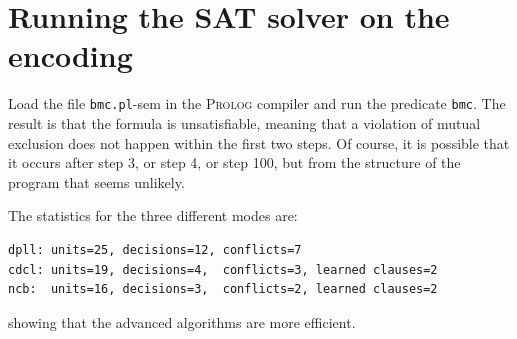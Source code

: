\documentclass[11pt]{report}
\newcommand*{\p}[1]{\textup{\texttt{#1}}}
\begin{document}

\section{Running the SAT solver on the encoding}

Load the file \p{bmc.pl}-sem in the \textsc{Prolog} compiler and run the predicate \p{bmc}. The result is that the formula is unsatisfiable, meaning that a violation of mutual exclusion does not happen within the first two steps. Of course, it is possible that it occurs after step 3, or step 4, or step 100, but from the structure of the program that seems unlikely.

The statistics for the three different modes are:
\begin{verbatim}
dpll: units=25, decisions=12, conflicts=7
cdcl: units=19, decisions=4,  conflicts=3, learned clauses=2
ncb:  units=16, decisions=3,  conflicts=2, learned clauses=2
\end{verbatim}
showing that the advanced algorithms are more efficient.
\end{document}

